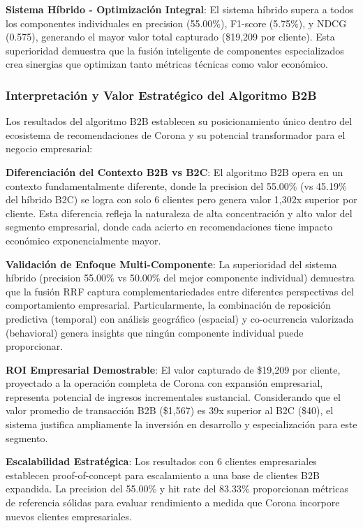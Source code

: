 \documentclass[twocolumn]{article}
\begin{document}
\textbf{Sistema Híbrido - Optimización Integral}: El sistema híbrido supera a todos los componentes individuales en precision (55.00\%), F1-score (5.75\%), y NDCG (0.575), generando el mayor valor total capturado (\$19,209 por cliente). Esta superioridad demuestra que la fusión inteligente de componentes especializados crea sinergias que optimizan tanto métricas técnicas como valor económico.

\subsubsection{Interpretación y Valor Estratégico del Algoritmo B2B}

Los resultados del algoritmo B2B establecen su posicionamiento único dentro del ecosistema de recomendaciones de Corona y su potencial transformador para el negocio empresarial:

\textbf{Diferenciación del Contexto B2B vs B2C}: El algoritmo B2B opera en un contexto fundamentalmente diferente, donde la precision del 55.00\% (vs 45.19\% del híbrido B2C) se logra con solo 6 clientes pero genera valor 1,302x superior por cliente. Esta diferencia refleja la naturaleza de alta concentración y alto valor del segmento empresarial, donde cada acierto en recomendaciones tiene impacto económico exponencialmente mayor.

\textbf{Validación de Enfoque Multi-Componente}: La superioridad del sistema híbrido (precision 55.00\% vs 50.00\% del mejor componente individual) demuestra que la fusión RRF captura complementariedades entre diferentes perspectivas del comportamiento empresarial. Particularmente, la combinación de reposición predictiva (temporal) con análisis geográfico (espacial) y co-ocurrencia valorizada (behavioral) genera insights que ningún componente individual puede proporcionar.

\textbf{ROI Empresarial Demostrable}: El valor capturado de \$19,209 por cliente, proyectado a la operación completa de Corona con expansión empresarial, representa potencial de ingresos incrementales sustancial. Considerando que el valor promedio de transacción B2B (\$1,567) es 39x superior al B2C (\$40), el sistema justifica ampliamente la inversión en desarrollo y especialización para este segmento.

\textbf{Escalabilidad Estratégica}: Los resultados con 6 clientes empresariales establecen proof-of-concept para escalamiento a una base de clientes B2B expandida. La precision del 55.00\% y hit rate del 83.33\% proporcionan métricas de referencia sólidas para evaluar rendimiento a medida que Corona incorpore nuevos clientes empresariales.
\end{document}
